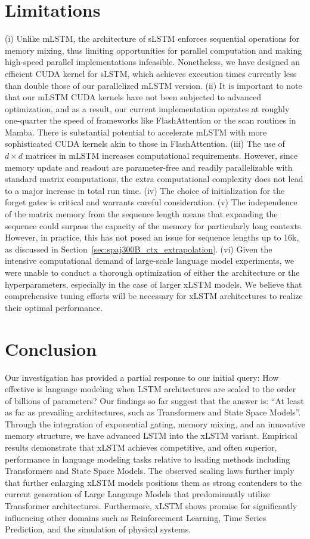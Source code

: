 \section{Limitations}

(i) Unlike mLSTM, the architecture of sLSTM enforces sequential operations for memory mixing, thus limiting opportunities for parallel computation and making high-speed parallel implementations infeasible. Nonetheless, we have designed an efficient CUDA kernel for sLSTM, which achieves execution times currently less than double those of our parallelized mLSTM version. (ii) It is important to note that our mLSTM CUDA kernels have not been subjected to advanced optimization, and as a result, our current implementation operates at roughly one-quarter the speed of frameworks like FlashAttention or the scan routines in Mamba. There is substantial potential to accelerate mLSTM with more sophisticated CUDA kernels akin to those in FlashAttention. (iii) The use of $d \times d$ matrices in mLSTM increases computational requirements. However, since memory update and readout are parameter-free and readily parallelizable with standard matrix computations, the extra computational complexity does not lead to a major increase in total run time. (iv) The choice of initialization for the forget gates is critical and warrants careful consideration. (v) The independence of the matrix memory from the sequence length means that expanding the sequence could surpass the capacity of the memory for particularly long contexts. However, in practice, this has not posed an issue for sequence lengths up to 16k, as discussed in Section~\ref{sec:spaj300B_ctx_extrapolation}. (vi) Given the intensive computational demand of large-scale language model experiments, we were unable to conduct a thorough optimization of either the architecture or the hyperparameters, especially in the case of larger xLSTM models. We believe that comprehensive tuning efforts will be necessary for xLSTM architectures to realize their optimal performance.

\section{Conclusion}
Our investigation has provided a partial response to our initial query: How effective is language modeling when LSTM architectures are scaled to the order of billions of parameters? Our findings so far suggest that the answer is: ``At least as far as prevailing architectures, such as Transformers and State Space Models''. Through the integration of exponential gating, memory mixing, and an innovative memory structure, we have advanced LSTM into the xLSTM variant. Empirical results demonstrate that xLSTM achieves competitive, and often superior, performance in language modeling tasks relative to leading methods including Transformers and State Space Models. The observed scaling laws further imply that further enlarging xLSTM models positions them as strong contenders to the current generation of Large Language Models that predominantly utilize Transformer architectures. Furthermore, xLSTM shows promise for significantly influencing other domains such as Reinforcement Learning, Time Series Prediction, and the simulation of physical systems.

